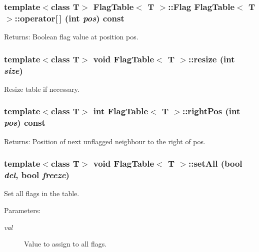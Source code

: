 \subsubsection{\setlength{\rightskip}{0pt plus 5cm}template$<$class T$>$ {\bf Flag\-Table}$<$ T $>$::{\bf Flag} {\bf Flag\-Table}$<$ T $>$::operator[$\,$] (int {\em pos}) const\hspace{0.3cm}{\tt  [inline]}}\label{classFlagTable_a17}


\begin{Desc}
\item[Returns:]Boolean flag value at position pos. \end{Desc}
\subsubsection{\setlength{\rightskip}{0pt plus 5cm}template$<$class T$>$ void {\bf Flag\-Table}$<$ T $>$::resize (int {\em size})}\label{classFlagTable_a3}


Resize table if necessary. 

\subsubsection{\setlength{\rightskip}{0pt plus 5cm}template$<$class T$>$ int {\bf Flag\-Table}$<$ T $>$::right\-Pos (int {\em pos}) const\hspace{0.3cm}{\tt  [inline]}}\label{classFlagTable_a8}


\begin{Desc}
\item[Returns:]Position of next unflagged neighbour to the right of pos. \end{Desc}
\subsubsection{\setlength{\rightskip}{0pt plus 5cm}template$<$class T$>$ void {\bf Flag\-Table}$<$ T $>$::set\-All (bool {\em del}, bool {\em freeze})\hspace{0.3cm}{\tt  [inline]}}\label{classFlagTable_a4}


Set all flags in the table. 

\begin{Desc}
\item[Parameters:]
\begin{description}
\item[{\em val}]Value to assign to all flags. \end{description}
\end{Desc}
